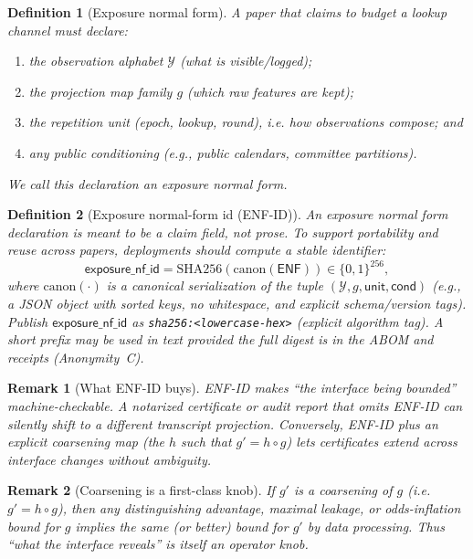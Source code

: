 \documentclass[11pt]{article}
\newtheorem{definition}{Definition}
\newtheorem{remark}{Remark}
\begin{document}
\begin{definition}[Exposure normal form]
A paper that claims to budget a lookup channel must declare:
\begin{enumerate}[leftmargin=*]
\item the observation alphabet $\mathcal{Y}$ (what is visible/logged);
\item the projection map family $g$ (which raw features are kept);
\item the repetition unit (epoch, lookup, round), i.e. how observations compose; and
\item any public conditioning (e.g., public calendars, committee partitions).
\end{enumerate}
We call this declaration an \emph{exposure normal form}.
\end{definition}

\begin{definition}[Exposure normal-form id (ENF-ID)]
An exposure normal form declaration is meant to be a \emph{claim field}, not prose.
To support portability and reuse across papers, deployments should compute a stable identifier:
\[
\mathsf{exposure\_nf\_id}=\mathrm{SHA256}(\mathrm{canon}(\mathsf{ENF}))\in\{0,1\}^{256},
\]
where $\mathrm{canon}(\cdot)$ is a canonical serialization of the tuple
$(\mathcal Y,g,\mathsf{unit},\mathsf{cond})$ (e.g., a JSON object with sorted keys, no whitespace, and explicit schema/version tags).
Publish $\mathsf{exposure\_nf\_id}$ as \texttt{sha256:<lowercase-hex>} (explicit algorithm tag). A short prefix may be used in text provided the full digest is in the ABOM and receipts (Anonymity~C).
\end{definition}

\begin{remark}[What ENF-ID buys]
ENF-ID makes ``the interface being bounded'' machine-checkable.
A notarized certificate or audit report that omits ENF-ID can silently shift to a different transcript projection.
Conversely, ENF-ID plus an explicit \emph{coarsening map} (the $h$ such that $g'=h\circ g$) lets certificates extend across interface changes without ambiguity.
\end{remark}


\begin{remark}[Coarsening is a first-class knob]
If $g'$ is a coarsening of $g$ (i.e. $g' = h\circ g$), then any distinguishing advantage, maximal leakage, or odds-inflation bound for $g$ implies the same (or better) bound for $g'$ by data processing.
Thus ``what the interface reveals'' is itself an operator knob.
\end{remark}
\end{document}
